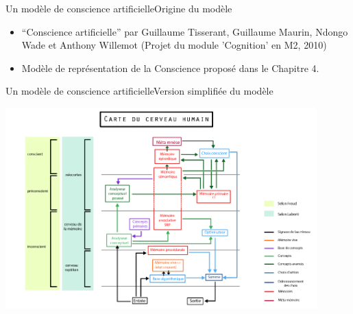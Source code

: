 \begin{frame}{Un modèle de conscience artificielle}{Origine du modèle}
\begin{itemize}
  \item \enquote{Conscience
  artificielle} par Guillaume Tisserant, Guillaume Maurin, Ndongo
  Wade et Anthony Willemot (Projet du module 'Cognition' en M2, 2010)
  \item Modèle de représentation de la Conscience proposé dans le Chapitre 4.
\end{itemize}
\end{frame}

\begin{frame}{Un modèle de conscience artificielle}{Version simplifiée du
modèle}
\begin{center}
\includegraphics[width=0.9\textwidth]{img/intro/modele_original}
\end{center}
\end{frame}

